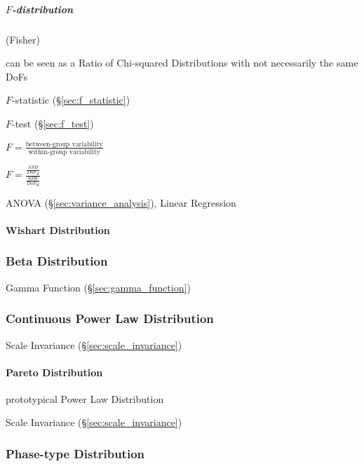\subparagraph{$F$-distribution}\label{sec:f_distribution}\hfill

(Fisher)

can be seen as a Ratio of Chi-squared Distributions with not necessarily the
same DoFs

$F$-statistic (\S\ref{sec:f_statistic})

$F$-test (\S\ref{sec:f_test})

$F = \frac{\text{between-group variability}}{\text{within-group variability}}$

$F = \frac{\frac{SSB}{DoF_B}}{\frac{SSW}{DoF_W}}$

ANOVA (\S\ref{sec:variance_analysis}), Linear Regression



\paragraph{Wishart Distribution}\label{sec:wishart_distribution}\hfill



\subsubsection{Beta Distribution}\label{sec:beta_distribution}

Gamma Function (\S\ref{sec:gamma_function})



\subsubsection{Continuous Power Law Distribution}
\label{sec:continuous_power_law_distribution}

Scale Invariance (\S\ref{sec:scale_invariance})



\paragraph{Pareto Distribution}\label{sec:pareto_distribution}\hfill

prototypical Power Law Distribution

Scale Invariance (\S\ref{sec:scale_invariance})



\subsubsection{Phase-type Distribution}\label{sec:phasetype_distribution}

